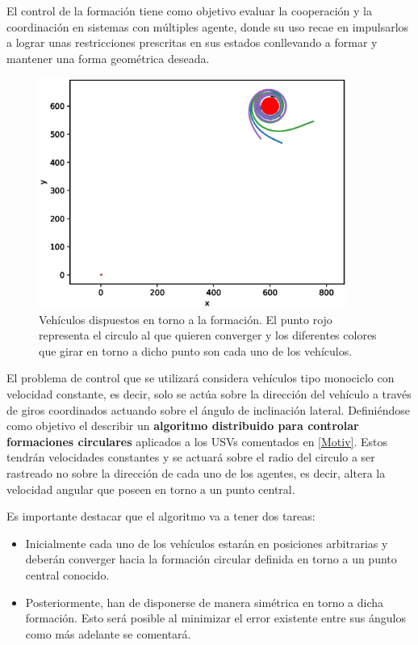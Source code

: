 El control de la formación tiene como objetivo evaluar la cooperación y la coordinación en sistemas con múltiples agente, donde su uso recae en impulsarlos a lograr unas restricciones prescritas en sus estados conllevando a formar y mantener una forma geométrica deseada.

\begin{figure}[htb]
\centering
\includegraphics[width=0.90\textwidth]{figures/Coordinacion/Objetivo_Final.eps}
\caption{Vehículos dispuestos en torno a la formación. El punto rojo representa el circulo al que quieren converger y los diferentes colores que girar en torno a dicho punto son cada uno de los vehículos.} \label{Ejemplo_Coordinacion}
\end{figure}
\newpage

El problema de control que se utilizará considera vehículos tipo monociclo con velocidad constante, es decir, solo se actúa sobre la dirección del vehículo a través de giros coordinados actuando sobre el ángulo de inclinación lateral. Definiéndose como objetivo el describir un \textbf{algoritmo distribuido para controlar formaciones circulares} aplicados a los USVs comentados en \ref{Motiv}. Estos tendrán velocidades constantes y se actuará sobre el radio del circulo a ser rastreado no sobre la dirección de cada uno de los agentes, es decir, altera la velocidad angular que poseen en torno a un punto central. 

Es importante destacar que el algoritmo va a tener dos tareas:

\begin{itemize}
	\item Inicialmente cada uno de los vehículos estarán en posiciones arbitrarias y deberán converger hacia la formación circular definida en torno a un punto central conocido.
	\item Posteriormente, han de disponerse de manera simétrica en torno a dicha formación. Esto será posible al minimizar el error existente entre sus ángulos como más adelante se comentará.
\end{itemize}


